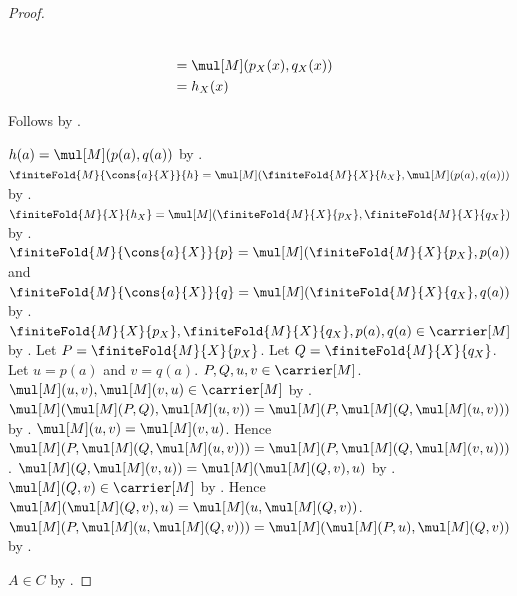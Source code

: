 \begin{proof}
\begin{subproof}
\begin{subproof}
\begin{byCase}
\begin{subproof}
\begin{subproof}
\begin{align*}
                                \\
                                &= \mul[M](p_X(x),q_X(x))
                                \\
                                &= h_X(x)
                        \end{align*}
                    \end{subproof}
                    Follows by .
                \end{subproof}
                $h(a)=\mul[M](p(a),q(a))$ by
                    .
                $\finiteFold{M}{\cons{a}{X}}{h}
                    =\mul[M](\finiteFold{M}{X}{h_X},
                        \mul[M](p(a),q(a)))$ by
                    .
                $\finiteFold{M}{X}{h_X}
                    =\mul[M](\finiteFold{M}{X}{p_X},
                        \finiteFold{M}{X}{q_X})$ by \auto.
                $\finiteFold{M}{\cons{a}{X}}{p}
                    =\mul[M](\finiteFold{M}{X}{p_X},p(a))$ and
                    $\finiteFold{M}{\cons{a}{X}}{q}
                    =\mul[M](\finiteFold{M}{X}{q_X},q(a))$ by
                    .
                $\finiteFold{M}{X}{p_X},
                    \finiteFold{M}{X}{q_X},p(a),q(a)
                    \in\carrier[M]$ by
                    .
                Let $P=\finiteFold{M}{X}{p_X}$.
                Let $Q=\finiteFold{M}{X}{q_X}$.
                Let $u=p(a)$ and $v=q(a)$.
                $P,Q,u,v\in\carrier[M]$.
                $\mul[M](u,v),\mul[M](v,u)\in\carrier[M]$ by
                    .
                $\mul[M](\mul[M](P,Q),\mul[M](u,v))
                    =\mul[M](P,\mul[M](Q,\mul[M](u,v)))$ by
                    .
                $\mul[M](u,v)=\mul[M](v,u)$.
                Hence $\mul[M](P,\mul[M](Q,\mul[M](u,v)))
                    =\mul[M](P,\mul[M](Q,\mul[M](v,u)))$.
                $\mul[M](Q,\mul[M](v,u))
                    =\mul[M](\mul[M](Q,v),u)$ by
                    .
                $\mul[M](Q,v)\in\carrier[M]$ by
                    .
                Hence $\mul[M](\mul[M](Q,v),u)
                    =\mul[M](u,\mul[M](Q,v))$.
                $\mul[M](P,\mul[M](u,\mul[M](Q,v)))
                    =\mul[M](\mul[M](P,u),\mul[M](Q,v))$ by
                    .
            \end{byCase}
        \end{subproof}
    \end{subproof}
    $A\in C$ by .
\end{proof}

